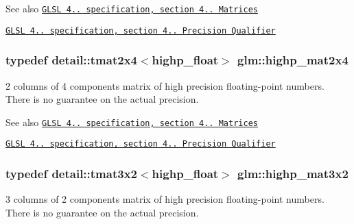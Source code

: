 \begin{DoxySeeAlso}{\-See also}
\href{http://www.opengl.org/registry/doc/GLSLangSpec.4.20.8.pdf}{\tt \-G\-L\-S\-L 4.. specification, section 4.. \-Matrices} 

\href{http://www.opengl.org/registry/doc/GLSLangSpec.4.20.8.pdf}{\tt \-G\-L\-S\-L 4.. specification, section 4.. \-Precision \-Qualifier} 
\end{DoxySeeAlso}
\hypertarget{group__core__precision_ga41deb7c45e9219ccccdc011aafd42f27}{
\subsubsection[{highp\-\_\-mat2x4}]{\setlength{\rightskip}{0pt plus 5cm}typedef detail\-::tmat2x4$<$highp\-\_\-float$>$ {\bf glm\-::highp\-\_\-mat2x4}}}\label{group__core__precision_ga41deb7c45e9219ccccdc011aafd42f27}
2 columns of 4 components matrix of high precision floating-\/point numbers. \-There is no guarantee on the actual precision.

\begin{DoxySeeAlso}{\-See also}
\href{http://www.opengl.org/registry/doc/GLSLangSpec.4.20.8.pdf}{\tt \-G\-L\-S\-L 4.. specification, section 4.. \-Matrices} 

\href{http://www.opengl.org/registry/doc/GLSLangSpec.4.20.8.pdf}{\tt \-G\-L\-S\-L 4.. specification, section 4.. \-Precision \-Qualifier} 
\end{DoxySeeAlso}
\hypertarget{group__core__precision_gae46e3b35f72ae06bc7d38ff29a189cfb}{
\subsubsection[{highp\-\_\-mat3x2}]{\setlength{\rightskip}{0pt plus 5cm}typedef detail\-::tmat3x2$<$highp\-\_\-float$>$ {\bf glm\-::highp\-\_\-mat3x2}}}\label{group__core__precision_gae46e3b35f72ae06bc7d38ff29a189cfb}
3 columns of 2 components matrix of high precision floating-\/point numbers. \-There is no guarantee on the actual precision.

